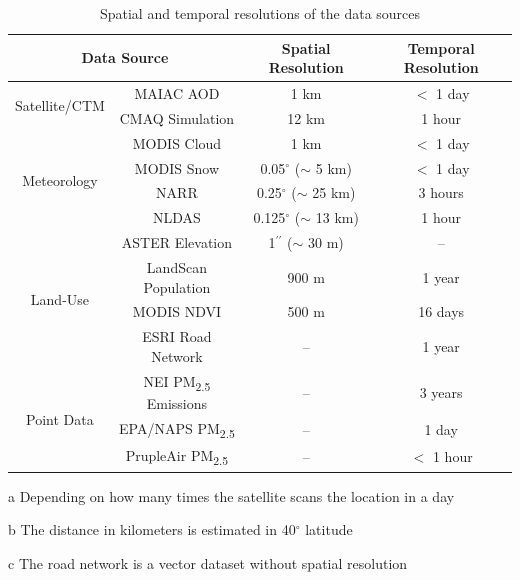 \documentclass[11pt]{article}
\newcommand{\tsub}{\textsubscript}
\begin{document}
\begin{table}[H]
\centering
    \begin{threeparttable}
        \caption{Spatial and temporal resolutions of the data sources}
        \label{tab:res}
        \begin{tabular}{c|c|c|c}
            \hline
            \multicolumn{2}{c|}{Data Source} & Spatial Resolution & Temporal Resolution \\
            \hline
            \multirow{2}{*}{Satellite/CTM} & MAIAC AOD & 1 km & $<$ 1 day\tnote{a} \\
            & CMAQ Simulation & 12 km & 1 hour \\
            \hline
            \multirow{4}{*}{Meteorology} & MODIS Cloud & 1 km & $<$ 1 day \\
            & MODIS Snow & 0.05$^{\circ}$ ($\sim$ 5 km)\tnote{b} & $<$ 1 day \\
            & NARR & 0.25$^{\circ}$ ($\sim$ 25 km) & 3 hours\\
            & NLDAS & 0.125$^{\circ}$ ($\sim$ 13 km) & 1 hour \\
            \hline
            \multirow{4}{*}{Land-Use} & ASTER Elevation & 1$^{\prime\prime}$ ($\sim$ 30 m) & -- \\
            & LandScan Population & 900 m & 1 year \\
            & MODIS NDVI & 500 m & 16 days \\
            & ESRI Road Network\tnote{c} & -- & 1 year \\
            \hline
            \multirow{3}{*}{Point Data} & NEI PM\tsub{2.5} Emissions  & -- & 3 years \\
            & EPA/NAPS PM\tsub{2.5} & -- & 1 day \\
            & PrupleAir PM\tsub{2.5} & -- & $<$ 1 hour \\
            \hline
        \end{tabular}
        \begin{tablenotes}
            \item [a] Depending on how many times the satellite scans the location in a day 
            \item [b] The distance in kilometers is estimated in 40$^{\circ}$ latitude
            \item [c] The road network is a vector dataset without spatial resolution
        \end{tablenotes}
    \end{threeparttable}
\end{table}

\newpage


\end{document}
